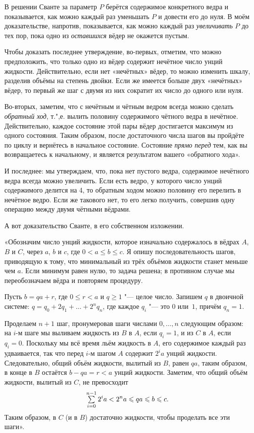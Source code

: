 \documentclass[twoside]{book}
\begin{document}
\medskip

В решении Сванте за параметр $P$ берётся содержимое конкретного ведра и показывается, как можно каждый раз уменьшать $P$ и довести его до нуля.
В моём доказательстве, напротив, показывается, как можно каждый раз \emph{увеличивать} $P$ до тех пор, пока одно из \emph{оставшихся} вёдер не окажется пустым.

Чтобы доказать последнее утверждение, во-первых, отметим, что можно предположить, что только одно из вёдер содержит нечётное число унций жидкости.
Действительно, если нет «нечётных» вёдер, то можно изменить шкалу, разделив объёмы на степень двойки.
Если же имеется больше двух «нечётных» вёдер, то первый же шаг с двумя из них сократит их число до одного или нуля.

Во-вторых, заметим, что с нечётным и чётным ведром всегда можно сделать \emph{обратный ход}, т.",е. вылить половину содержимого чётного ведра в нечётное.
Действительно, каждое состояние этой пары вёдер достигается максимум из одного состояния.
Таким образом, после достаточного числа шагов вы пройдёте по циклу и вернётесь в начальное состояние.
Состояние \emph{прямо перед} тем, как вы возвращаетесь к начальному, и является результатом вашего «обратного хода».

И последнее: мы утверждаем, что, пока нет пустого ведра, содержимое нечётного ведра всегда можно увеличить.
Если есть ведро, у которого число унций содержимого делится на 4, то обратным ходом можно половину его перелить в нечётное ведро.
Если же такового нет, то его легко получить, совершив одну операцию между двумя чётными вёдрами.
\heart

А вот доказательство Сванте, в его собственном изложении.

\medskip

«Обозначим число унций жидкости, которое изначально содержалось в вёдрах $A$, $B$ и $C$, через $a$, $b$ и $c$, где $0<a\le b\le c$.
Я опишу последовательность шагов, приводящую к тому, что минимальный из трёх объёмов жидкости станет меньше чем $a$.
Если минимум равен нулю, то задача решена; в противном случае мы переобозначаем вёдра и повторяем процедуру.

Пусть $b = qa + r$, где $0\le r<a$ и $q\ge 1$ "--- целое число.
Запишем $q$ в двоичной системе: $q=q_0+2q_1+\ldots+2^nq_n$, где каждое $q_i$ "--- это $0$ или~$1$, причём $q_n = 1$.

Проделаем $n+1$ шаг, пронумеровав шаги числами $0,\dots, n$ следующим образом: на $i$-м шаге  мы выливаем жидкость из $B$ в $A$, если $q_i = 1$, и из $C$ в $A$, если $q_i = 0$.
Поскольку мы всё время льём жидкость в $A$, его содержимое каждый раз удваивается, так что  перед $i$-м шагом $A$ содержит $2^ia$ унций жидкости.
Следовательно, общий объём жидкости, вылитый из $B$, равен $qa$, таким образом, в конце  в $B$ остаётся $b-qa=r<a$ унций жидкости.
Заметим, что общий объём жидкости, вылитый из $C$, не превосходит
\[
  \mathop{\textstyle\sum}\limits_{i=0}^{n-1} 2^ia<2^na\leqslant qa\leqslant b\leqslant c.\]
Таким образом, в $C$ (и в $B$) достаточно жидкости, чтобы проделать все эти шаги».
\heart
\end{document}
